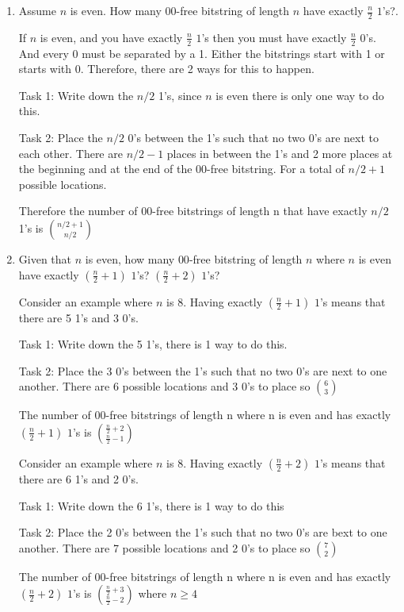 \documentclass[12pt]{article}
\newcounter{ques}
\newenvironment{question}{\refstepcounter{ques}{\noindent\bf Question \arabic{ques}:}}{\vspace{5mm}}
\begin{document}
\begin{question}
\begin{enumerate}[label = (\alph*)]
		\item Assume $n$ is even. How many $00$-free bitstring of length $n$ have exactly $\frac{n}{2}$ $1$'s?.
		
		If $n$ is even, and you have exactly $\frac{n}{2}$ $1$'s then you must have exactly $\frac{n}{2}$ $0$'s.
		And every 0 must be separated by a 1. Either the bitstrings start with 1 or starts with 0.
		Therefore, there are 2 ways for this to happen.

		Task 1: Write down the $n/2$ 1's, since $n$ is even there is only one way to do this.

		Task 2: Place the $n/2$ 0's between the 1's such that no two 0's are next to each other.
				There are $n/2-1$ places in between the 1's and 2 more places at the beginning and at the end of the 00-free bitstring.
				For a total of $n/2+1$ possible locations.

		Therefore the number of 00-free bitstrings of length n that have exactly $n/2$ 1's is
		${n/2+1} \choose {n/2}$

		\item\label{c} Given that $n$ is even, how many $00$-free bitstring of length $n$ where $n$ is even have exactly $(\frac{n}{2}+1)$ $1$'s? $(\frac{n}{2}+2)$ $1$'s?
				
		Consider an example where $n$ is 8. Having exactly $(\frac{n}{2}+1)$ $1$'s means that there are 5 1's
		and 3 0's.

		Task 1: Write down the 5 1's, there is 1 way to do this.

		Task 2: Place the 3 0's between the 1's such that no two 0's are next to one another. 
				There are 6 possible locations and 3 0's to place so ${6 \choose 3}$

		The number of 00-free bitstrings of length n where n is even and has exactly $(\frac{n}{2}+1)$ $1$'s 
		is ${\frac{n}{2} + 2} \choose {\frac{n}{2} - 1}$


		Consider an example where $n$ is 8. Having exactly $(\frac{n}{2}+2)$ $1$'s means that there are 6 1's
		and 2 0's.

		Task 1: Write down the 6 1's, there is 1 way to do this

		Task 2: Place the 2 0's between the 1's such that no two 0's are bext to one another. 
		There are 7 possible locations and 2 0's to place so ${7 \choose 2}$

		The number of 00-free bitstrings of length n where n is even and has exactly $(\frac{n}{2}+2)$ $1$'s 
		is ${\frac{n}{2} + 3} \choose {\frac{n}{2} - 2}$ where $n \geq 4$



\end{enumerate}
\end{question}
\end{document}
